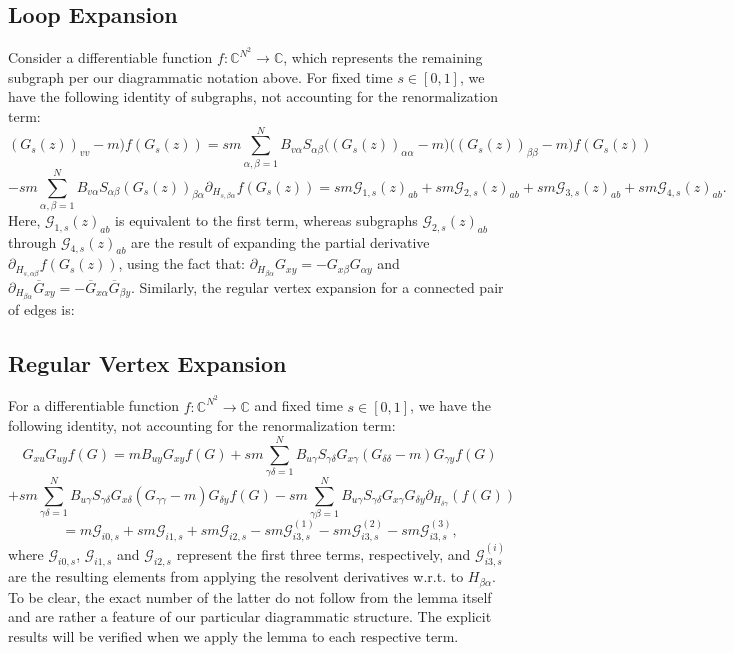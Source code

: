 \documentclass[11pt]{article}
\begin{document}
\subsection*{Loop Expansion}
Consider a differentiable function $f: \mathbb{C}^{N^2}\rightarrow\mathbb{C}$, which represents the remaining subgraph per our diagrammatic notation above. For fixed time $s\in [0, 1]$, we have the following identity of subgraphs, not accounting for the renormalization term: 
\begin{equation*}
(G_s(z))_{vv} - m) f(G_s(z)) = {sm} \sum_{\alpha, \beta=1}^N B_{v\alpha} S_{\alpha\beta} \big((G_s(z))_{\alpha\alpha} - m\big)\big((G_s(z))_{\beta\beta} - m\big) f(G_s(z))
\end{equation*}
\begin{equation*}
 - sm \sum_{\alpha, \beta=1}^N B_{v\alpha} S_{\alpha\beta} {(G_s(z))_{\beta\alpha}} \partial_{H_{s,\beta\alpha}} f(G_s(z)) = {sm}\mathcal{G}_{1, s}(z)_{ab}+sm\mathcal{G}_{2, s}(z)_{ab} + sm\mathcal{G}_{3, s}(z)_{ab} + sm\mathcal{G}_{4, s}(z)_{ab}.
\end{equation*}
Here, $\mathcal{G}_{1, s}(z)_{ab}$ is equivalent to the first term, whereas subgraphs $\mathcal{G}_{2, s}(z)_{ab}$ through $\mathcal{G}_{4, s}(z)_{ab}$ are the result of expanding the partial derivative $\partial_{H_{s, \alpha\beta}}f(G_s(z))$, using the fact that: $\partial_{H_{\beta\alpha}} G_{xy} = -G_{x\beta}G_{\alpha y}$ and $\partial_{H_{\beta\alpha}}\overline{G}_{xy} = -\overline{G}_{x\alpha}\overline{G}_{\beta y}$.  Similarly, the regular vertex expansion for a connected pair of edges is:
\subsection*{Regular Vertex Expansion}
For a differentiable function $f: \mathbb{C}^{N^2}\rightarrow\mathbb{C}$ and fixed time $s\in [0, 1]$, we have the following identity, not accounting for the renormalization term: \begin{equation*}
G_{xu}G_{uy}f(G) = mB_{uy}G_{xy} f(G) + sm\sum_{\gamma\delta=1}^N B_{u\gamma} S_{\gamma\delta} G_{x\gamma}(G_{\delta\delta}-m)G_{\gamma y} f(G)
\end{equation*}
$$+sm\sum_{\gamma\delta=1}^N B_{u\gamma} S_{\gamma\delta} G_{x\delta}(G_{\gamma\gamma}-m)G_{\delta y}f(G)-sm\sum_{\gamma\beta=1}^N B_{u\gamma}S_{\gamma\delta}G_{x\gamma}G_{\delta y}\partial_{H_{\delta \gamma}}(f(G))$$
$$= m\mathcal{G}_{i0, s}+sm\mathcal{G}_{i1,s}+sm\mathcal{G}_{i2, s}-sm\mathcal{G}_{i3,s}^{(1)}-sm\mathcal{G}_{i3,s}^{(2)}-sm\mathcal{G}_{i3,s}^{(3)},$$
where $\mathcal{G}_{i0, s}$, $\mathcal{G}_{i1, s}$ and $\mathcal{G}_{i2, s}$ represent the first three terms, respectively, and $\mathcal{G}_{i3, s}^{(i)}$ are the resulting elements from applying 
the resolvent derivatives w.r.t. to $H_{\beta\alpha}$. To be clear, the exact number of the latter do not follow from the lemma itself and are rather a feature of our particular diagrammatic structure. The explicit results will be verified when we apply the lemma to each respective term.
\end{document}
